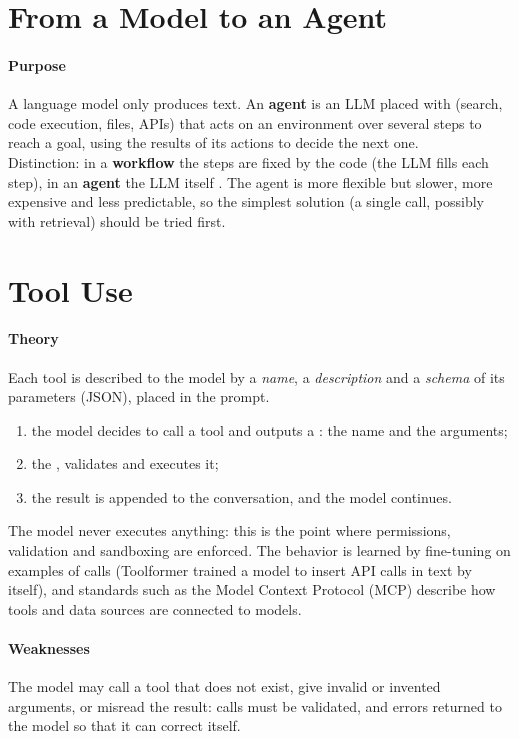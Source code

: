 \section{From a Model to an Agent}
\paragraph{Purpose}
A language model only produces text. An \textbf{agent} is an LLM placed  with
 (search, code execution, files, APIs) that acts on an environment over several
steps to reach a goal, using the results of its actions to decide the next one.\\
Distinction: in a \textbf{workflow} the steps are fixed by the code (the LLM fills each
step), in an \textbf{agent} the LLM itself . The agent is
more flexible but slower, more expensive and less predictable, so the simplest solution
(a single call, possibly with retrieval) should be tried first.

\section{Tool Use}
\paragraph{Theory}
Each tool is described to the model by a \emph{name}, a \emph{description} and a
\emph{schema} of its parameters (JSON), placed in the prompt.
\begin{enumerate}
    \item the model decides to call a tool and outputs a : the name and
        the arguments;
    \item the , validates and executes it;
    \item the result is appended to the conversation, and the model continues.
\end{enumerate}
The model never executes anything: this is the point where permissions, validation and
sandboxing are enforced. The behavior is learned by fine-tuning on examples of calls
(Toolformer trained a model to insert API calls in text by itself), and standards such as
the Model Context Protocol (MCP) describe how tools and data sources are connected to
models.

\paragraph{Weaknesses} The model may call a tool that does not exist, give invalid or
invented arguments, or misread the result: calls must be validated, and errors returned to
the model so that it can correct itself.

